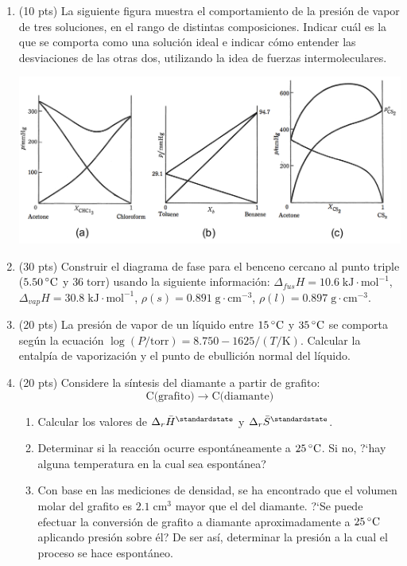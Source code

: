 \documentclass[a4paper,12pt]{article}
\begin{document}
\begin{enumerate}

 \item (10 pts) La siguiente figura muestra el comportamiento de la presi\'on de vapor de tres soluciones, en el rango de distintas composiciones. Indicar cu\'al es la que se comporta como una soluci\'on ideal e indicar c\'omo entender las desviaciones de las otras dos, utilizando la idea de fuerzas intermoleculares.

\begin{center}
 \includegraphics[scale=0.3]{figure1}
\end{center} %

 \item (30 pts) Construir el diagrama de fase para el benceno cercano al punto triple ($5.50\,\celsius$ y $36\;\mbox{torr}$) usando la siguiente informaci\'on: $\Delta_{fus}H=10.6\;\mbox{kJ}\cdot\mbox{mol}^{-1}$, $\Delta_{vap}H=30.8\;\mbox{kJ}\cdot\mbox{mol}^{-1}$, $\rho(s)=0.891\;\mbox{g}\cdot\mbox{cm}^{-3}$, $\rho(l)=0.897\;\mbox{g}\cdot\mbox{cm}^{-3}$. %

 \item (20 pts) La presi\'on de vapor de un l\'iquido entre $15\,\celsius$ y $35\,\celsius$ se comporta seg\'un la ecuaci\'on $\log(P/\mbox{torr})=8.750-1625/(T/\mbox{K})$. Calcular la entalp\'ia de vaporizaci\'on y el punto de ebullici\'on normal del l\'iquido. %

 \item (20 pts) Considere la s\'intesis del diamante a partir de grafito:
$$\mbox{C(grafito)}\;\rightarrow\;\mbox{C(diamante)}$$
 \begin{enumerate}
  \item Calcular los valores de $\Delta_r\bar{H}^\standardstate$ y $\Delta_r\bar{S}^\standardstate$.
  \item Determinar si la reacci\'on ocurre espont\'aneamente a $25\,\celsius$. Si no, ?`hay alguna temperatura en la cual sea espont\'anea?
  \item Con base en las mediciones de densidad, se ha encontrado que el volumen molar del grafito es $2.1\;\mbox{cm}^3$ mayor que el del diamante. ?`Se puede efectuar la conversi\'on de grafito a diamante aproximadamente a $25\,\celsius$ aplicando presi\'on sobre \'el? De ser as\'i, determinar la presi\'on a la cual el proceso se hace espont\'aneo.
 \end{enumerate} %


\end{enumerate}
\end{document}
